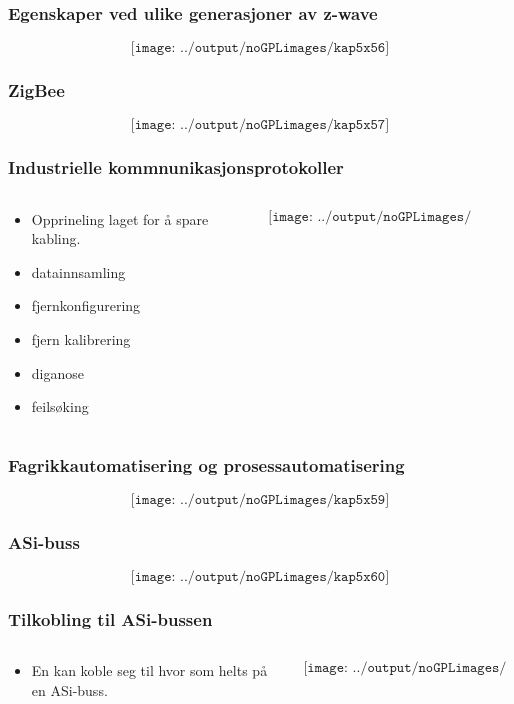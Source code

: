 \documentclass[aspectratio=169,xcolor=dvipsnames]{beamer}
\begin{document}
\begin{frame}
	\frametitle{Egenskaper ved ulike generasjoner av z-wave}
	$$\texttt{[image: ../output/noGPLimages/kap5x56]}$$
\end{frame}
\begin{frame}
	\frametitle{ZigBee}
	$$\texttt{[image: ../output/noGPLimages/kap5x57]}$$
\end{frame}
\begin{frame}
	\frametitle{Industrielle kommnunikasjonsprotokoller}
	\begin{columns}
		\begin{column}{0.5\textwidth}

			\begin{itemize}
				\item Opprineling laget for å spare kabling. 
				\item datainnsamling
				\item fjernkonfigurering
				\item fjern kalibrering
				\item diganose
				\item feilsøking
			\end{itemize}

			
		\end{column}

		\begin{column}{0.5\textwidth}
	$$\texttt{[image: ../output/noGPLimages/kap5x58]}$$
		\end{column}
	\end{columns}
\end{frame}
\begin{frame}
	\frametitle{Fagrikkautomatisering og prosessautomatisering}
	$$\texttt{[image: ../output/noGPLimages/kap5x59]}$$
\end{frame}
\begin{frame}
	\frametitle{ASi-buss}
	$$\texttt{[image: ../output/noGPLimages/kap5x60]}$$
\end{frame}
\begin{frame}
	\frametitle{Tilkobling til  ASi-bussen}
	\begin{columns}
		\begin{column}{0.5\textwidth}

			\begin{itemize}
				\item En kan koble seg til hvor som helts på en ASi-buss. 
			\end{itemize}

			
		\end{column}

		\begin{column}{0.5\textwidth}
	$$\texttt{[image: ../output/noGPLimages/kap5x61]}$$
		\end{column}
	\end{columns}
\end{frame}
\end{document}
